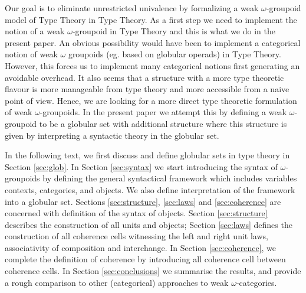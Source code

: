 Our goal is to eliminate unrestricted univalence by formalizing a weak
$\omega$-groupoid model of Type Theory in Type Theory.  As a first
step we need to implement the notion of a weak $\omega$-groupoid in
Type Theory and this is what we do in the present paper.  An obvious
possibility would have been to implement a categorical notion of weak
$\omega$ groupoids (eg. based on globular operads) in Type
Theory. However, this forces us to implement many categorical notions
first generating an avoidable overhead. It also seems that a structure
with a more type theoretic flavour is more manageable from type theory
and more accessible from a naive point of view. Hence, we are looking
for a more direct type theoretic formulation of weak
$\omega$-groupoids. In the present paper we attempt this by defining a
weak $\omega$-groupoid to be a globular set with additional structure
where this structure is given by interpreting a syntactic theory in
the globular set.

In the following text, we first discuss and define globular sets in
type theory in Section \ref{sec:glob}. In Section \ref{sec:syntax} we
start introducing the syntax of $\omega$-groupoids by defining the general
syntactical framework which includes variables contexts, categories,
and objects. We also define interpretation of the framework into a
globular set. Sections \ref{sec:structure}, \ref{sec:laws} and
\ref{sec:coherence} are concerned with definition of the syntax of
objects. Section \ref{sec:structure} describes the construction of all
units and objects; Section \ref{sec:laws} defines the construction of
all coherence cells witnessing the left and right unit laws,
associativity of composition and interchange. In Section
\ref{sec:coherence}, we complete the definition of coherence by
introducing all coherence cell between coherence cells. In Section
\ref{sec:conclusions}  we summarise the results, and provide a rough
comparison to other (categorical) approaches to weak
$\omega$-categories. 



